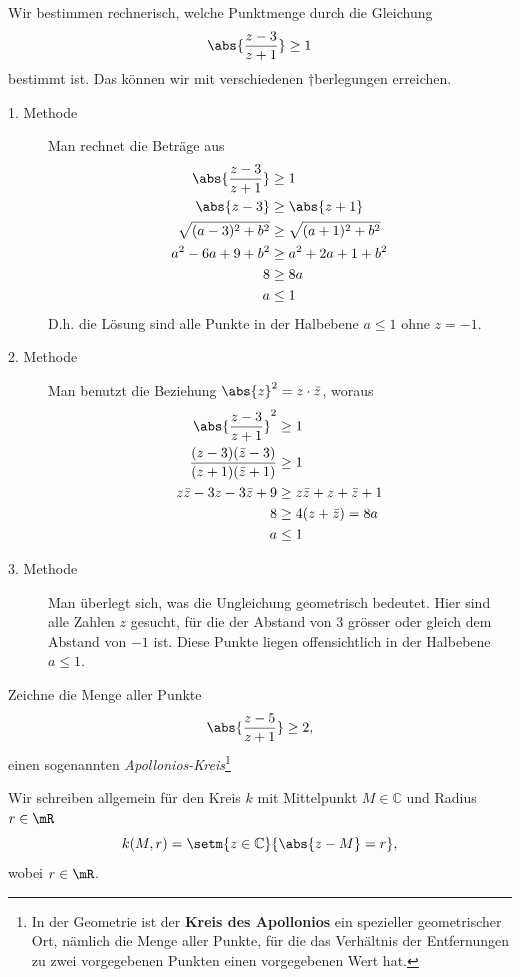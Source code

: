 \documentclass[%
11pt,%
twoside,%
titlepage,%
german,%
headsepline%
]{scrartcl}
\begin{document}
\begin{bsp}
Wir bestimmen rechnerisch, welche Punktmenge durch die Gleichung
$$\abs{\frac{z-3}{z+1}}\geq1$$
bestimmt ist. Das k\"onnen wir mit verschiedenen †berlegungen erreichen.

\begin{description}
\item[1. Methode] Man rechnet die Beträge aus
\begin{align*}
\abs{\frac{z-3}{z+1}}&\geq1\\
\abs{z-3}&\geq\abs{z+1}\\
\sqrt{(a-3)^2+b^2}&\geq\sqrt{(a+1)^2+b^2}\\
a^2-6a+9+b^2&\geq a^2+2a+1+b^2\\
8&\geq 8a\\
a&\leq1
\end{align*}
D.h. die L\"osung sind alle Punkte in der Halbebene $a\leq1$ ohne $z=-1$.
\item[2. Methode] Man benutzt die Beziehung $\abs{z}^2=z\cdot\bar{z}$, woraus
\begin{align*}
\abs{\frac{z-3}{z+1}}^2&\geq1\\
\frac{(z-3)(\bar{z}-3)}{(z+1)(\bar{z}+1)}&\geq1\\
z\bar{z}-3z-3\bar{z}+9&\geq z\bar{z}+z+\bar{z}+1\\
8&\geq 4(z+\bar{z})=8a\\
a&\leq1
\end{align*}
\item[3. Methode] Man \"uberlegt sich, was die Ungleichung geometrisch bedeutet. Hier sind alle Zahlen $z$ gesucht, f\"ur die der Abstand von $3$ gr\"osser oder gleich dem Abstand von $-1$ ist. Diese Punkte liegen offensichtlich in der Halbebene $a\leq1$.
\end{description}
\end{bsp}

\begin{ueb}
Zeichne die Menge aller Punkte
$$\abs{\frac{z-5}{z+1}}\geq2,$$
einen sogenannten \emph{Apollonios-Kreis}\footnote{In der Geometrie ist der \textbf{Kreis des Apollonios} ein spezieller geometrischer Ort, nämlich die Menge aller Punkte, f\"ur die das Verhältnis der Entfernungen zu zwei vorgegebenen Punkten einen vorgegebenen Wert hat.}
\end{ueb}

Wir schreiben allgemein f\"ur den Kreis
$k$ mit Mittelpunkt $M\in\mathbb{C}$ und Radius $r\in\mR$
$$k(M,r)=\setm{z\in\mathbb{C}}{\abs{z-M}=r},$$
wobei $r\in\mR$.
\end{document}
